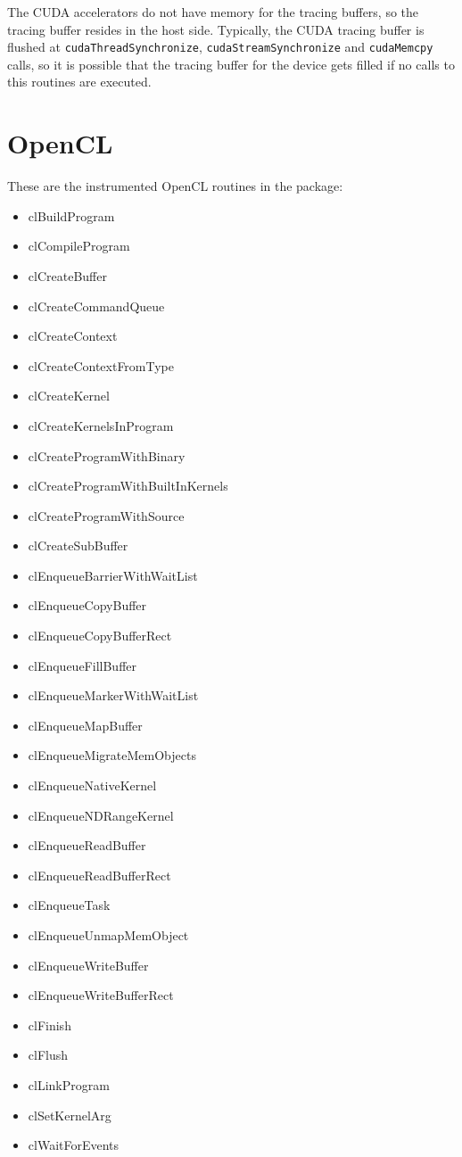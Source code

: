 The CUDA accelerators do not have memory for the tracing buffers, so the tracing buffer resides in the host side.
Typically, the CUDA tracing buffer is flushed at {\tt cudaThreadSynchronize}, {\tt cudaStreamSynchronize} and {\tt cudaMemcpy} calls, so it is possible that the tracing buffer for the device gets filled if no calls to this routines are executed.

\section{OpenCL}\label{sec:OPENCLinstrumentedroutines}

These are the instrumented OpenCL routines in the \TRACE package:

\begin{itemize}
\item clBuildProgram
\item clCompileProgram
\item clCreateBuffer
\item clCreateCommandQueue
\item clCreateContext
\item clCreateContextFromType
\item clCreateKernel
\item clCreateKernelsInProgram
\item clCreateProgramWithBinary
\item clCreateProgramWithBuiltInKernels
\item clCreateProgramWithSource
\item clCreateSubBuffer
\item clEnqueueBarrierWithWaitList
\item clEnqueueCopyBuffer
\item clEnqueueCopyBufferRect
\item clEnqueueFillBuffer
\item clEnqueueMarkerWithWaitList
\item clEnqueueMapBuffer
\item clEnqueueMigrateMemObjects
\item clEnqueueNativeKernel
\item clEnqueueNDRangeKernel
\item clEnqueueReadBuffer
\item clEnqueueReadBufferRect
\item clEnqueueTask
\item clEnqueueUnmapMemObject
\item clEnqueueWriteBuffer
\item clEnqueueWriteBufferRect
\item clFinish
\item clFlush
\item clLinkProgram
\item clSetKernelArg
\item clWaitForEvents
\end{itemize}

